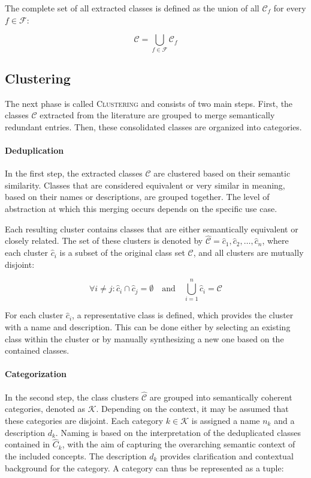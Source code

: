 The complete set of all extracted classes is defined as the union of all $\mathcal{C}_{f}$ for every $f \in \mathcal{F}$:

\[
\mathcal{C} = \bigcup_{f \in \mathcal{F}} \mathcal{C}_{f}
\]


\subsection{Clustering}
\label{sec:tax_proc_clustering}

The next phase is called \textsc{Clustering} and consists of two main steps. First, the classes $\mathcal{C}$ extracted from the literature are grouped to merge semantically redundant entries. Then, these consolidated classes are organized into categories.

\paragraph{Deduplication}
In the first step, the extracted classes $\mathcal{C}$ are clustered based on their semantic similarity. Classes that are considered equivalent or very similar in meaning, based on their names or descriptions, are grouped together. The level of abstraction at which this merging occurs depends on the specific use case.

Each resulting cluster contains classes that are either semantically equivalent or closely related. The set of these clusters is denoted by $\hat{\mathcal{C}} = {\hat{c}_1, \hat{c}_2, \dots, \hat{c}_n}$, where each cluster $\hat{c}_i$ is a subset of the original class set $\mathcal{C}$, and all clusters are mutually disjoint:

\[
\forall i \ne j: \hat{c}_i \cap \hat{c}_j = \emptyset
\quad \text{and} \quad \bigcup_{i=1}^{n} \hat{c}_i = \mathcal{C}
\]

For each cluster $\hat{c}_i$, a representative class is defined, which provides the cluster with a name and description. This can be done either by selecting an existing class within the cluster or by manually synthesizing a new one based on the contained classes.

\paragraph{Categorization}
In the second step, the class clusters $\hat{\mathcal{C}}$ are grouped into semantically coherent categories, denoted as $\mathcal{K}$. Depending on the context, it may be assumed that these categories are disjoint. Each category $k \in \mathcal{K}$ is assigned a name $n_k$ and a description $d_k$. Naming is based on the interpretation of the deduplicated classes contained in $\hat{C}_k$, with the aim of capturing the overarching semantic context of the included concepts. The description $d_k$ provides clarification and contextual background for the category. A category can thus be represented as a tuple:

